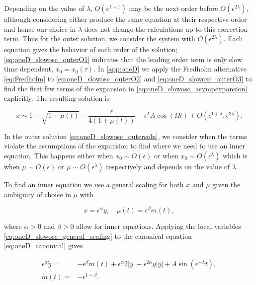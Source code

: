 Depending on the value of $\lambda$, $O(\epsilon^{\lambda+1})$ may be the next order before $O(\epsilon^{2\lambda})$, although considering either produce the same equation at their respective order and hence our choice in $\lambda$ does not change the calculations up to this correction term. Thus for the outer solution, we consider the system with $O(\epsilon^{2\lambda})$. Each equation gives the behavior of each order of the solution; \eqref{eq:oneD_slowosc_outerO1} indicates that the leading order term is only slow time dependent, $x_0=x_0(\tau)$. In \autoref{app:oneD} we apply the Fredholm alternative \eqref{eq:Fredholm} to \eqref{eq:oneD_slowosc_outerO2} and \eqref{eq:oneD_slowosc_outerO3} to find the first few terms of the expansion in \eqref{eq:oneD_slowosc_asympexpansion} explicitly. The resulting solution is

\begin{equation}\label{eq:oneD_slowosc_outersoln}
x\sim 1-\sqrt{1+\mu(t)}-\frac{\epsilon}{4(1+\mu(t))}-\epsilon^\lambda A \cos(\Omega t)+O(\epsilon^{1+\lambda},\epsilon^{2\lambda}).
\end{equation}

In the outer solution \eqref{eq:oneD_slowosc_outersoln}, we consider when the terms violate the assumptions of the expansion to find where we need to use an inner equation. This happens either when $x_0\sim O(\epsilon)$ or when $x_0\sim O(\epsilon^\lambda)$ which is when $\mu\sim O(\epsilon)$ or $\mu\sim O(\epsilon^\lambda)$ respectively and depends on the value of $\lambda$.

To find an inner equation we use a general scaling for both $x$ and $\mu$ given the ambiguity of choice in $\mu$ with

\begin{equation}\label{eq:oneD_slowosc_general_scaling}
x=\epsilon^\alpha y ,\quad \mu(t)=\epsilon^\beta m(t),
\end{equation}

where $\alpha>0$ and $\beta>0$ allow for inner equations. Applying the local variables \eqref{eq:oneD_slowosc_general_scaling} to the canonical equation \eqref{eq:oneD_canonical} gives

\begin{equation}\label{eq:oneD_slowosc_innerscaled}
\begin{aligned}
\epsilon^\alpha \dot{y}=& -\epsilon^\beta m(t)+\epsilon^\alpha 2|y| - \epsilon^{2\alpha}y|y| +A\sin(\epsilon^{-\lambda}t),\\
\dot{m}(t)=&-\epsilon^{1-\beta}.
\end{aligned}
\end{equation}

